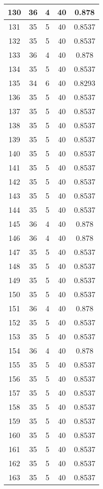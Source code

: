 \documentclass[letterpaper, 12pt]{article}
\begin{document}
\begin{longtable}{|c|c|c|c|c|}
\hline
130 & 36 & 4 & 40 & 0.878 \\
\hline
131 & 35 & 5 & 40 & 0.8537 \\
\hline
132 & 35 & 5 & 40 & 0.8537 \\
\hline
133 & 36 & 4 & 40 & 0.878 \\
\hline
134 & 35 & 5 & 40 & 0.8537 \\
\hline
135 & 34 & 6 & 40 & 0.8293 \\
\hline
136 & 35 & 5 & 40 & 0.8537 \\
\hline
137 & 35 & 5 & 40 & 0.8537 \\
\hline
138 & 35 & 5 & 40 & 0.8537 \\
\hline
139 & 35 & 5 & 40 & 0.8537 \\
\hline
140 & 35 & 5 & 40 & 0.8537 \\
\hline
141 & 35 & 5 & 40 & 0.8537 \\
\hline
142 & 35 & 5 & 40 & 0.8537 \\
\hline
143 & 35 & 5 & 40 & 0.8537 \\
\hline
144 & 35 & 5 & 40 & 0.8537 \\
\hline
145 & 36 & 4 & 40 & 0.878 \\
\hline
146 & 36 & 4 & 40 & 0.878 \\
\hline
147 & 35 & 5 & 40 & 0.8537 \\
\hline
148 & 35 & 5 & 40 & 0.8537 \\
\hline
149 & 35 & 5 & 40 & 0.8537 \\
\hline
150 & 35 & 5 & 40 & 0.8537 \\
\hline
151 & 36 & 4 & 40 & 0.878 \\
\hline
152 & 35 & 5 & 40 & 0.8537 \\
\hline
153 & 35 & 5 & 40 & 0.8537 \\
\hline
154 & 36 & 4 & 40 & 0.878 \\
\hline
155 & 35 & 5 & 40 & 0.8537 \\
\hline
156 & 35 & 5 & 40 & 0.8537 \\
\hline
157 & 35 & 5 & 40 & 0.8537 \\
\hline
158 & 35 & 5 & 40 & 0.8537 \\
\hline
159 & 35 & 5 & 40 & 0.8537 \\
\hline
160 & 35 & 5 & 40 & 0.8537 \\
\hline
161 & 35 & 5 & 40 & 0.8537 \\
\hline
162 & 35 & 5 & 40 & 0.8537 \\
\hline
163 & 35 & 5 & 40 & 0.8537 \\

\end{longtable}
\end{document}
